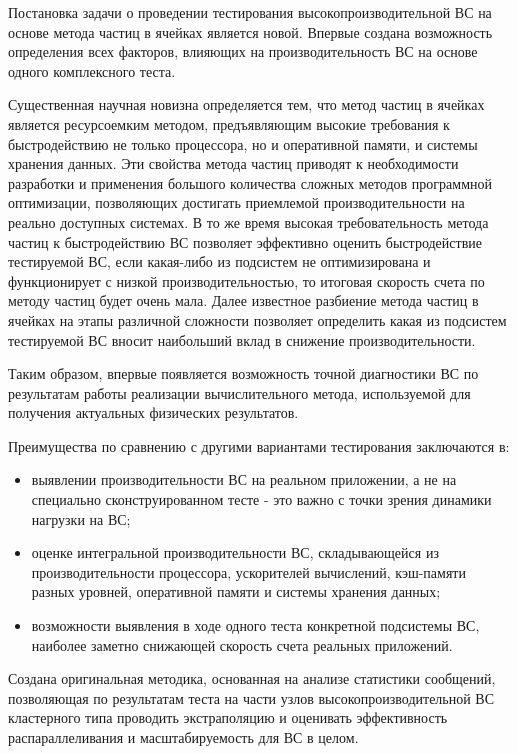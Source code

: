 {\novelty}
Постановка задачи о проведении тестирования высокопроизводительной ВС на основе метода частиц в ячейках является новой. Впервые создана возможность определения всех факторов, влияющих на производительность ВС на основе одного комплексного теста. 

Существенная научная новизна определяется тем, что метод частиц в ячейках является ресурсоемким методом, предъявляющим высокие требования к быстродействию не только процессора, но и оперативной памяти, и системы хранения данных. Эти свойства метода частиц приводят к необходимости разработки и применения большого количества сложных методов программной оптимизации, позволяющих достигать приемлемой производительности на реально доступных системах. В то же время высокая требовательность метода частиц к быстродействию ВС позволяет эффективно оценить быстродействие тестируемой ВС, если какая-либо из подсистем не оптимизирована и функционирует с низкой производительностью, то итоговая скорость счета по методу частиц будет очень мала.
Далее известное разбиение метода частиц в ячейках на этапы различной сложности позволяет определить какая из подсистем тестируемой ВС вносит наибольший вклад в снижение производительности. 

Таким образом, впервые появляется возможность точной диагностики ВС по результатам работы реализации вычислительного метода, используемой для получения актуальных физических результатов.   

Преимущества по сравнению с другими вариантами тестирования заключаются в:
\begin{itemize}
	\item выявлении производительности ВС на реальном приложении, а не на специально сконструированном тесте - это важно с точки зрения динамики нагрузки на ВС; 
	
	\item оценке интегральной производительности ВС, складывающейся из производительности процессора, ускорителей вычислений, кэш-памяти разных уровней, оперативной памяти и системы хранения данных;
	\item возможности выявления в ходе одного теста конкретной подсистемы ВС, наиболее заметно снижающей скорость счета реальных приложений. 
	
\end{itemize}
Создана оригинальная методика, основанная на анализе статистики сообщений, позволяющая по результатам теста на части узлов высокопроизводительной ВС кластерного типа проводить экстраполяцию и оценивать эффективность распараллеливания и масштабируемость для ВС в целом.

